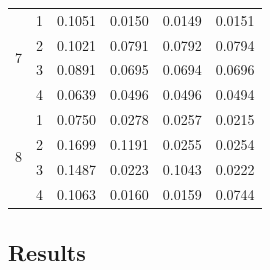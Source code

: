 \documentclass[a4paper, 11pt]{article} %
\begin{document}
\begin{table}[h]
\begin{tabular}{cc cccc}
  \hline
  \multirow{4}{*}{7}
&1 & 0.1051 & 0.0150 & 0.0149 & 0.0151 \\ 
&  2 & 0.1021 & 0.0791 & 0.0792 & 0.0794 \\ 
&  3 & 0.0891 & 0.0695 & 0.0694 & 0.0696 \\ 
&  4 & 0.0639 & 0.0496 & 0.0496 & 0.0494 \\ 
   \hline
  \multirow{4}{*}{8}
&1 & 0.0750 & 0.0278 & 0.0257 & 0.0215 \\ 
&  2 & 0.1699 & 0.1191 & 0.0255 & 0.0254 \\ 
&  3 & 0.1487 & 0.0223 & 0.1043 & 0.0222 \\ 
&  4 & 0.1063 & 0.0160 & 0.0159 & 0.0744 \\  
   \hline
\end{tabular}
\end{table}

\newpage
\subsection{Results} \label{AppendixTables}
\end{document}
